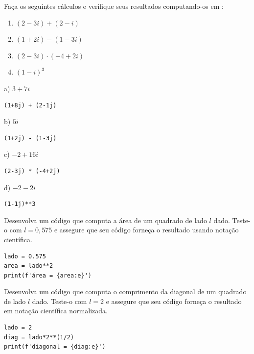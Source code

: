 \begin{exer}
  Faça os seguintes cálculos e verifique seus resultados computando-os em {\python}:
  \begin{enumerate}
  \item $(2-3i) + (2-i)$
  \item $(1+2i) - (1-3i)$
  \item $(2-3i) \cdot (-4+2i)$
  \item $(1-i)^3$
  \end{enumerate}
\end{exer}
\begin{resp}
  a) $3+7i$

\begin{lstlisting}
(1+8j) + (2-1j)
\end{lstlisting}

  b) $5i$

\begin{lstlisting}
(1+2j) - (1-3j)
\end{lstlisting}

  c) $-2+16i$

\begin{lstlisting}
(2-3j) * (-4+2j)
\end{lstlisting}

  d) $-2-2i$

\begin{lstlisting}
(1-1j)**3
\end{lstlisting}

\end{resp}


\begin{exer}
  Desenvolva um código {\python} que computa a área de um quadrado de lado $l$ dado. Teste-o com $l=0,575$ e assegure que seu código forneça o resultado usando notação científica.
\end{exer}
\begin{resp}

\begin{lstlisting}
lado = 0.575
area = lado**2
print(f'área = {area:e}')
\end{lstlisting}

\end{resp}

\begin{exer}
  Desenvolva um código {\python} que computa o comprimento da diagonal de um quadrado de lado $l$ dado. Teste-o com $l=2$ e assegure que seu código forneça o resultado em notação científica normalizada.
\end{exer}
\begin{resp}

\begin{lstlisting}
lado = 2
diag = lado*2**(1/2)
print(f'diagonal = {diag:e}')
\end{lstlisting}

\end{resp}

